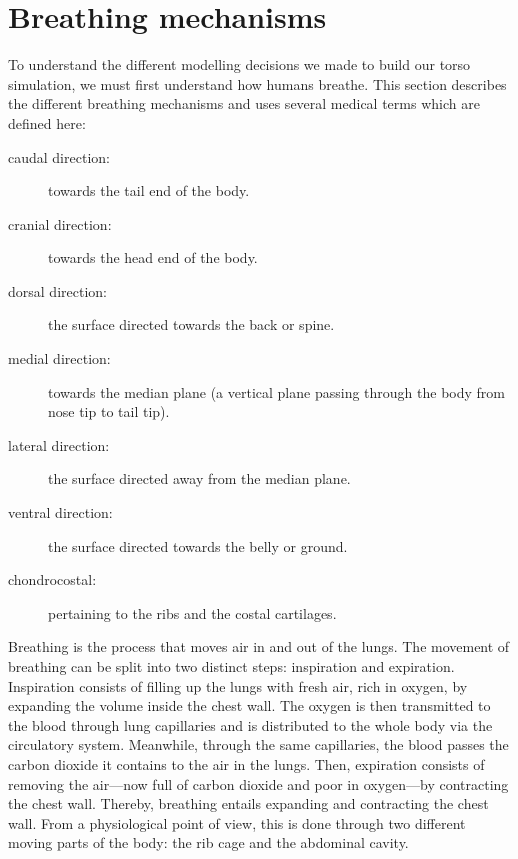 \section{\label{sec:breathing_mechanisms}Breathing mechanisms}
To understand the different modelling decisions we made to build our torso simulation, we must first understand how humans breathe. This section describes the different breathing mechanisms and uses several medical terms which are defined here:

\begin{description}
	\item[caudal direction:] towards the tail end of the body.
	\item[cranial direction:] towards the head end of the body.
	\item[dorsal direction:] the surface directed towards the back or spine.
	\item[medial direction:] towards the median plane (a vertical plane passing through the body from nose tip to tail tip).
	\item[lateral direction:] the surface directed away from the median plane.
	\item[ventral direction:] the surface directed towards the belly or ground.
	\item[chondrocostal:] pertaining to the ribs and the costal cartilages.

\end{description}

Breathing is the process that moves air in and out of the lungs. The movement of breathing can be split into two distinct steps: inspiration and expiration. Inspiration consists of filling up the lungs with fresh air, rich in oxygen, by expanding the volume inside the chest wall. The oxygen is then transmitted to the blood through lung capillaries and is distributed to the whole body via the circulatory system. Meanwhile, through the same capillaries, the blood passes the carbon dioxide it contains to the air in the lungs. Then, expiration consists of removing the air---now full of carbon dioxide and poor in oxygen---by contracting the chest wall.
Thereby, breathing entails expanding and contracting the chest wall. From a physiological point of view, this is done through two different moving parts of the body: the rib cage and the abdominal cavity.

